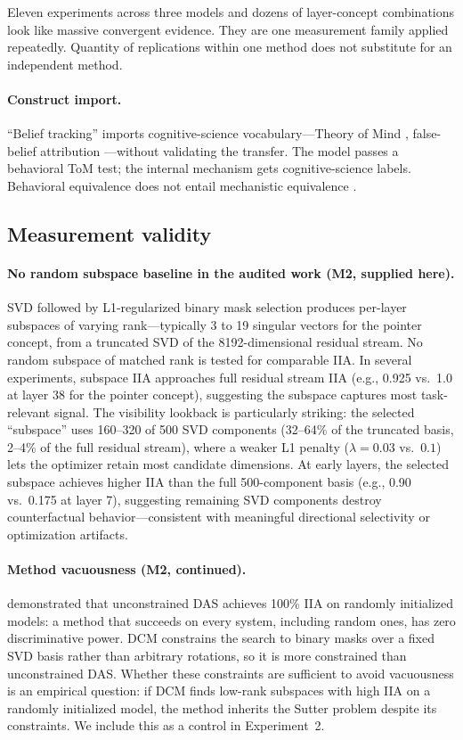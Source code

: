 \documentclass{article}
\begin{document}
Eleven experiments across three models and dozens of layer-concept combinations look like massive convergent evidence. They are one measurement family applied repeatedly. Quantity of replications within one method does not substitute for an independent method.

\paragraph{Construct import.}
``Belief tracking'' imports cognitive-science vocabulary---Theory of Mind \citep{premack1978chimpanzee}, false-belief attribution \citep{wimmer1983beliefs}---without validating the transfer. The model passes a behavioral ToM test; the internal mechanism gets cognitive-science labels. Behavioral equivalence does not entail mechanistic equivalence \citep{hu2025reevaluating}.

\subsection{Measurement validity}

\paragraph{No random subspace baseline in the audited work (M2, supplied here).}
SVD followed by L1-regularized binary mask selection produces per-layer subspaces of varying rank---typically 3 to 19 singular vectors for the pointer concept, from a truncated SVD of the 8192-dimensional residual stream. No random subspace of matched rank is tested for comparable IIA. In several experiments, subspace IIA approaches full residual stream IIA (e.g., 0.925 vs.\ 1.0 at layer 38 for the pointer concept), suggesting the subspace captures most task-relevant signal. The visibility lookback is particularly striking: the selected ``subspace'' uses 160--320 of 500 SVD components (32--64\% of the truncated basis, 2--4\% of the full residual stream), where a weaker L1 penalty ($\lambda = 0.03$ vs.\ $0.1$) lets the optimizer retain most candidate dimensions. At early layers, the selected subspace achieves higher IIA than the full 500-component basis (e.g., 0.90 vs.\ 0.175 at layer 7), suggesting remaining SVD components destroy counterfactual behavior---consistent with meaningful directional selectivity or optimization artifacts.

\paragraph{Method vacuousness (M2, continued).}
\citet{sutter2025vacuous} demonstrated that unconstrained DAS achieves 100\% IIA on randomly initialized models: a method that succeeds on every system, including random ones, has zero discriminative power. DCM constrains the search to binary masks over a fixed SVD basis rather than arbitrary rotations, so it is more constrained than unconstrained DAS. Whether these constraints are sufficient to avoid vacuousness is an empirical question: if DCM finds low-rank subspaces with high IIA on a randomly initialized model, the method inherits the Sutter problem despite its constraints. We include this as a control in Experiment~2.
\end{document}
